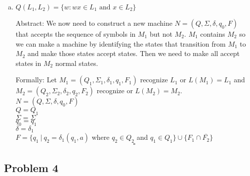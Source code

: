 \documentclass{article}
\begin{document}
\begin{enumerate}[a)]
    \item $Q(L_1,L_2)=\{w:wx \in L_1 \text{ and } x\in L_2\}$

    Abstract: We now need to construct a new machine $N = (Q, \Sigma, \delta, q_0, F) $
    that accepts
    the sequence of symbols in $M_1$ but not $M_2$. $M_1$ contains $M_2$
    so we can make a machine by identifying the states that transition from $M_1$ to $M_2$
    and make those states accept states. Then we need to make all accept states in $M_2$
    normal states.


    Formally:
    Let $M_1 = (Q_1, \Sigma_1, \delta_1, q_1, F_1)$ recognize $L_1$ or $L(M_1) = L_1$ 
    and $M_2 = (Q_2, \Sigma_2, \delta_2, q_2, F_2)$ recognize or $L(M_2) = M_2$. \\

    $N = (Q, \Sigma, \delta, q_0, F) $\\
    $Q = Q_1 $\\
    $\Sigma = \Sigma$ \\
    $q_0 = q_1$ \\
    $\delta = \delta_1$ \\
    $F = \{q_1\ |\ q_2 = \delta_1(q_1,a)$ where $q_2 \in Q_2 $ and $q_1 \in Q_1\} 
    \cup \{ F_1 \cap \overline{F_2} \}$
    \[ \square \]
\end{enumerate}

\newpage

\subsection*{Problem 4}
\end{document}
